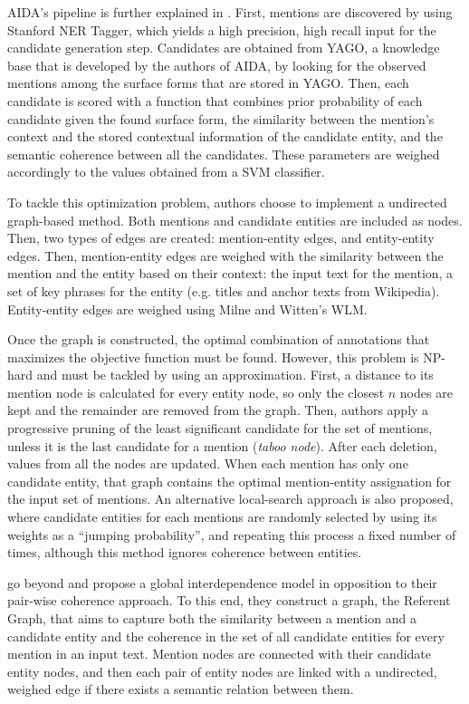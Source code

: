 AIDA's pipeline is further explained in \cite{hoffart2011}. First, mentions are discovered by using Stanford NER Tagger, which yields a high precision, high recall input for the candidate generation step. Candidates are obtained from YAGO, a knowledge base that is developed by the authors of AIDA, by looking for the observed mentions among the surface forms that are stored in YAGO. Then, each candidate is scored with a function that combines prior probability of each candidate given the found surface form, the similarity between the mention's context and the stored contextual information of the candidate entity, and the semantic coherence between all the candidates. These parameters are weighed accordingly to the values obtained from a SVM classifier.

To tackle this optimization problem, authors choose to implement a undirected graph-based method. Both mentions and candidate entities are included as nodes. Then, two types of edges are created: mention-entity edges, and entity-entity edges. Then, mention-entity edges are weighed with the similarity between the mention and the entity based on their context: the input text for the mention, a set of key phrases for the entity (e.g. titles and anchor texts from Wikipedia). Entity-entity edges are weighed using Milne and Witten's WLM.

Once the graph is constructed, the optimal combination of annotations that maximizes the objective function must be found. However, this problem is NP-hard and must be tackled by using an approximation. First, a distance to its mention node is calculated for every entity node, so only the closest $n$ nodes are kept and the remainder are removed from the graph. Then, authors apply a progressive pruning of the least significant candidate for the set of mentions, unless it is the last candidate for a mention (\emph{taboo node}). After each deletion, values from all the nodes are updated. When each mention has only one candidate entity, that graph contains the optimal mention-entity assignation for the input set of mentions. An alternative local-search approach is also proposed, where candidate entities for each mentions are randomly selected by using its weights as a ``jumping probability'', and repeating this process a fixed number of times, although this method ignores coherence between entities.

\medskip

\cite{han2011} go beyond \cite{kulkarni2009} and propose a global interdependence model in opposition to their pair-wise coherence approach. To this end, they construct a graph, the Referent Graph, that aims to capture both the similarity between a mention and a candidate entity and the coherence in the set of all candidate entities for every mention in an input text. Mention nodes are connected with their candidate entity nodes, and then each pair of entity nodes are linked with a undirected, weighed edge if there exists a semantic relation between them.


